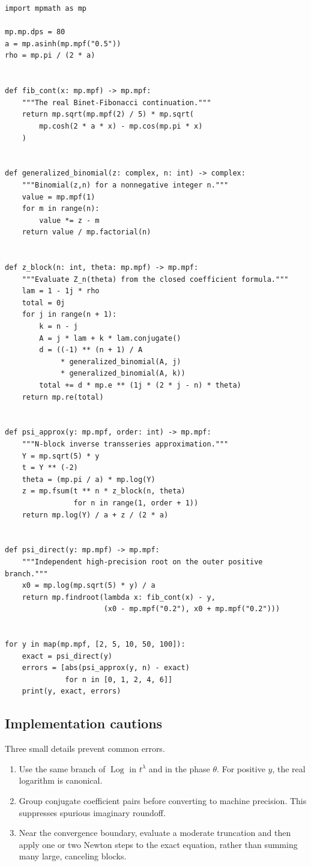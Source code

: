 \documentclass[11pt,oneside]{article}
\theoremstyle{plain}
\theoremstyle{definition}
\theoremstyle{remark}
\newcommand{\Log}{\operatorname{Log}}
\begin{document}
\begin{lstlisting}[style=pythonstyle,caption={High-precision numerical comparison with the defining equation.}]
import mpmath as mp

mp.mp.dps = 80
a = mp.asinh(mp.mpf("0.5"))
rho = mp.pi / (2 * a)


def fib_cont(x: mp.mpf) -> mp.mpf:
    """The real Binet-Fibonacci continuation."""
    return mp.sqrt(mp.mpf(2) / 5) * mp.sqrt(
        mp.cosh(2 * a * x) - mp.cos(mp.pi * x)
    )


def generalized_binomial(z: complex, n: int) -> complex:
    """Binomial(z,n) for a nonnegative integer n."""
    value = mp.mpf(1)
    for m in range(n):
        value *= z - m
    return value / mp.factorial(n)


def z_block(n: int, theta: mp.mpf) -> mp.mpf:
    """Evaluate Z_n(theta) from the closed coefficient formula."""
    lam = 1 - 1j * rho
    total = 0j
    for j in range(n + 1):
        k = n - j
        A = j * lam + k * lam.conjugate()
        d = ((-1) ** (n + 1) / A
             * generalized_binomial(A, j)
             * generalized_binomial(A, k))
        total += d * mp.e ** (1j * (2 * j - n) * theta)
    return mp.re(total)


def psi_approx(y: mp.mpf, order: int) -> mp.mpf:
    """N-block inverse transseries approximation."""
    Y = mp.sqrt(5) * y
    t = Y ** (-2)
    theta = (mp.pi / a) * mp.log(Y)
    z = mp.fsum(t ** n * z_block(n, theta)
                for n in range(1, order + 1))
    return mp.log(Y) / a + z / (2 * a)


def psi_direct(y: mp.mpf) -> mp.mpf:
    """Independent high-precision root on the outer positive branch."""
    x0 = mp.log(mp.sqrt(5) * y) / a
    return mp.findroot(lambda x: fib_cont(x) - y,
                       (x0 - mp.mpf("0.2"), x0 + mp.mpf("0.2")))


for y in map(mp.mpf, [2, 5, 10, 50, 100]):
    exact = psi_direct(y)
    errors = [abs(psi_approx(y, n) - exact)
              for n in [0, 1, 2, 4, 6]]
    print(y, exact, errors)
\end{lstlisting}

\subsection{Implementation cautions}

Three small details prevent common errors.
\begin{enumerate}
\item Use the same branch of \(\Log\) in \(t^\lambda\) and in the phase
\(\theta\).  For positive \(y\), the real logarithm is canonical.
\item Group conjugate coefficient pairs before converting to machine
precision.  This suppresses spurious imaginary roundoff.
\item Near the convergence boundary, evaluate a moderate truncation and then
apply one or two Newton steps to the exact equation, rather than summing many
large, canceling blocks.
\end{enumerate}
\end{document}
